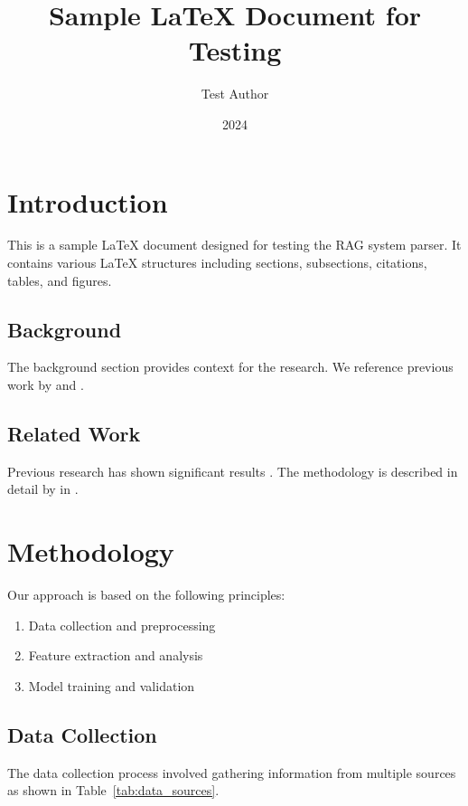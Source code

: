 \documentclass{article}
\title{Sample LaTeX Document for Testing}
\author{Test Author}
\date{2024}
\begin{document}
\maketitle


\chapter{Introduction}
\label{chap:intro}

This is a sample LaTeX document designed for testing the RAG system parser. It contains various LaTeX structures including sections, subsections, citations, tables, and figures.

\section{Background}
\label{sec:background}

The background section provides context for the research. We reference previous work by \cite{einstein1905} and \citep{newton1687}.

\section{Related Work}
\label{sec:related}

Previous research has shown significant results \citet{smith2023}. The methodology is described in detail by \citeauthor{jones2022} in \citeyear{jones2022}.\


\chapter{Methodology}
\label{chap:method}

Our approach is based on the following principles:

\begin{enumerate}
\item Data collection and preprocessing
\item Feature extraction and analysis
\item Model training and validation
\end{enumerate}

\section{Data Collection}
\label{subsec:data}

The data collection process involved gathering information from multiple sources as shown in Table~\ref{tab:data_sources}.
\end{document}
